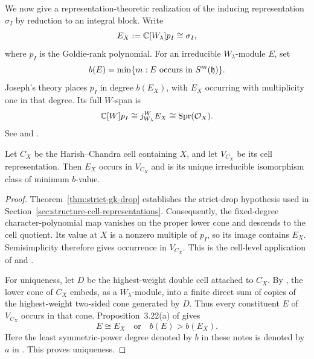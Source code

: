 We now give a representation-theoretic realization of the inducing
representation $\sigma_I$ by reduction to an integral block. Write
\[
  E_X:=\mathbb{C}[W_\lambda]p_I\cong\sigma_I,
\]
where $p_I$ is the Goldie-rank polynomial. For an irreducible
$W_\lambda$-module $E$, set
\[
  b(E)=\min\{m:E\text{ occurs in }S^m(\mathfrak{h})\}.
\]
Joseph's theory places $p_I$ in degree $b(E_X)$, with $E_X$ occurring
with multiplicity one in that degree. Its full $W$-span is
\begin{equation}\label{eq:special-annihilator-polynomial-span}
  \mathbb{C}[W]p_I
  \cong j_{W_\lambda}^{W}E_X
  \cong\operatorname{Spr}(\mathcal{O}_X).
\end{equation}
See \cite[Props.~3.22, 3.24 and 3.26]{BMSZ22} and
\cite[Prop.~3.2]{BMW2024}.

\begin{lem}\label{lem:special-annihilator-cell-minimum}
Let $C_X$ be the Harish--Chandra cell containing $X$, and let $V_{C_X}$
be its cell representation. Then $E_X$ occurs in $V_{C_X}$ and is its
unique irreducible isomorphism class of minimum $b$-value.
\end{lem}

\begin{proof}
Theorem~\ref{thm:strict-gk-drop} establishes the strict-drop hypothesis
used in Section~\ref{sec:structure-cell-representations}. Consequently,
the fixed-degree character-polynomial map vanishes on the proper
lower cone and descends to the cell quotient. Its value at $X$ is a
nonzero multiple of $p_I$, so its image contains $E_X$. Semisimplicity
therefore gives occurrence in $V_{C_X}$. This is the cell-level
application of \cite[Thm.~14.10]{Vogan1982} and \cite{King1981}.

For uniqueness, let $D$ be the highest-weight double cell attached to
$C_X$. By \cite[Lem.~4.8 and Prop.~4.10]{BMSZ22}, the lower cone of
$C_X$ embeds, as a $W_\lambda$-module, into a finite direct sum of
copies of the highest-weight two-sided cone generated by $D$.
Thus every constituent $E$ of $V_{C_X}$ occurs in that cone.
Proposition~3.22(a) of \cite{BMSZ22} gives
\[
  E\cong E_X
  \quad\text{or}\quad
  b(E)>b(E_X).
\]
Here the least symmetric-power degree denoted by $b$ in these notes
is denoted by $a$ in \cite[(3.14)]{BMSZ22}. This proves uniqueness.
\end{proof}

